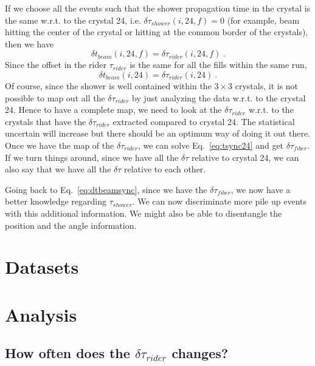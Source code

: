 \documentclass[12pt,letterpaper]{article}
\begin{document}
If we choose all the events such that the shower propagation time in the crystal is the same w.r.t. to the crystal 24, i.e. $\delta \tau_{shower}(i,24,f)=0$ (for example, beam hitting the center of the crystal or hitting at the common border of the crystals),
then we have
%
\begin{equation}
\delta t_{beam}(i,24,f)   = \delta \tau_{rider}(i,24,f)~.
\end{equation}
%
Since the offset in the rider $\tau_{rider}$ is the same for all the fills within the same run, 
%
\begin{equation}
\delta t_{beam}(i,24)   = \delta \tau_{rider}(i,24)~.
\end{equation}
%
Of course, since the shower is well contained within the $3\times3$ crystals, it is not possible to map out all the $\delta \tau_{rider}$ by just analyzing
the data w.r.t. to the crystal 24. Hence to have a complete map, we need to look at the $\delta \tau_{rider}$ w.r.t. to the crystals that have the  $\delta \tau_{rider}$ extracted compared to crystal 24. The statistical uncertain will increase but there should be an optimum way of doing it out there.
%
Once we have the map of the $\delta \tau_{rider}$, we can solve Eq.~\ref{eq:tsync24} and get $\delta \tau_{fiber}$.
If we turn things around, since we have all the $\delta \tau$ relative to crystal 24, we can also say that we have all the $\delta \tau$
relative to each other.

Going back to Eq.~\ref{eq:dtbeamsync}, since we have the $\delta \tau_{fiber}$, we now have a better knowledge 
regarding $\tau_{shower}$. We can now discriminate more pile up events with this additional information.
We might also be able to disentangle the position and the angle information.

\section{Datasets}

\section{Analysis}


\subsection{How often does the $\delta \tau_{rider}$ changes?}
\end{document}
